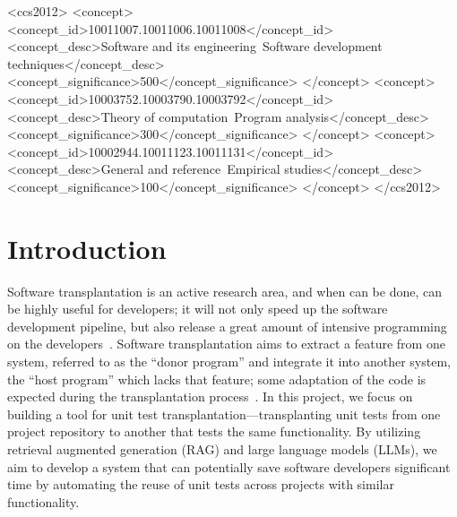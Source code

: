 \documentclass[sigconf]{acmart}
\begin{document}
\begin{CCSXML}
<ccs2012>
  <concept>
  <concept_id>10011007.10011006.10011008</concept_id>
  <concept_desc>Software and its engineering~Software development techniques</concept_desc>
  <concept_significance>500</concept_significance>
  </concept>
  <concept>
  <concept_id>10003752.10003790.10003792</concept_id>
  <concept_desc>Theory of computation~Program analysis</concept_desc>
  <concept_significance>300</concept_significance>
  </concept>
  <concept>
  <concept_id>10002944.10011123.10011131</concept_id>
  <concept_desc>General and reference~Empirical studies</concept_desc>
  <concept_significance>100</concept_significance>
  </concept>
</ccs2012>
\end{CCSXML}




\maketitle

\section{Introduction}
%
Software transplantation is an active research area, and when can be done, can be highly useful for developers; it will not only speed up the software development pipeline, but also release a great amount of intensive programming on the developers~\cite{alshahwan2023_softwaretestingchallenges,barr2015_automatedsoftwaretransplantation, sodhi2021_an_insight_on_software_features_supporting_transplantation__a_systematic_review}.
%
Software transplantation aims to extract a feature from one system, referred to as the ``donor program'' and integrate it into another system, the ``host program'' which lacks that feature; some adaptation of the code is expected during the transplantation process~\cite{barr2015_automatedsoftwaretransplantation, sodhi2021_an_insight_on_software_features_supporting_transplantation__a_systematic_review}.
%
In this project, we focus on building a tool for unit test transplantation—transplanting unit tests from one project repository to another that tests the same functionality.
%
By utilizing retrieval augmented generation (RAG) and large language models (LLMs), we aim to develop a system that can potentially save software developers significant time by automating the reuse of unit tests across projects with similar functionality.
\end{document}
